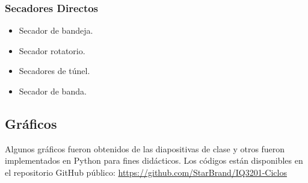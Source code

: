         \subsubsection{Secadores Directos}
        
        \begin{quote}
        \end{quote}
        
            
            
                \begin{itemize}
                    \item Secador de bandeja.
                \end{itemize}
                
                \begin{multicols}{3}
                    \begin{itemize}
                        \item Secador rotatorio.
                        \item Secadores de túnel.
                        \item Secador de banda.
                    \end{itemize}
                \end{multicols}

\begin{anexo}
    \section{Gráficos}
    
    Algunos gráficos fueron obtenidos de las diapositivas de clase \cite{gracia_c_iq3201_2020} y otros fueron implementados en Python para fines didácticos. Los códigos están disponibles en el repositorio GitHub público: \href{https://github.com/StarBrand/IQ3201-Ciclos}{https://github.com/StarBrand/IQ3201-Ciclos}
    
    
    
\end{anexo}
